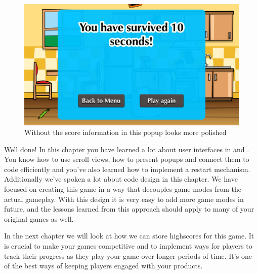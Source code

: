 \begin{figure}[H]
    \centering
    \includegraphics[width=0.75\linewidth]{images/Chapter7/ui_fadeout_popup.png}
    \caption{Without the score information in  this popup
    looks more polished}
\end{figure}

Well done! In this chapter you have learned a lot about user interfaces in \SB{}
and \cocos{}. You know how to use scroll views, how to present popups and
connect them to code efficiently and you've also learned how to implement a
restart mechanism. Additionally we've spoken a lot about code design in this
chapter. We have focused on creating this game in a way that decouples game
modes from the actual gameplay. With this design it is very easy to add more
game modes in future, and the lessons learned from this approach should apply to
many of your original games as well.

In the next chapter we will look at how we can store highscores for this game.
It is crucial to make your games competitive and to implement ways for players
to track their progress as they play your game over longer periods of time. It's
one of the best ways of keeping players engaged with your products.